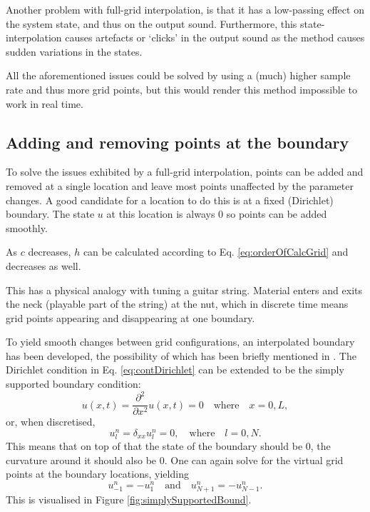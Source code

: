Another problem with full-grid interpolation, is that it has a low-passing effect on the system state, and thus on the output sound. %
Furthermore, this state-interpolation causes artefacts or `clicks' in the output sound as the method causes sudden variations in the states.  

All the aforementioned issues could be solved by using a (much) higher sample rate and thus more grid points, but this would render this method impossible to work in real time.

\subsection{Adding and removing points at the boundary}\label{sec:addAtBoundary}
To solve the issues exhibited by a full-grid interpolation, points can be added and removed at a single location and leave most points unaffected by the parameter changes. A good candidate for a location to do this is at a fixed (Dirichlet) boundary. The state $u$ at this location is always $0$ so points can be added smoothly. 

As $c$ decreases, $h$ can be calculated according to Eq. \eqref{eq:orderOfCalcGrid} and decreases as well.

This has a physical analogy with tuning a guitar string. Material enters and exits the neck (playable part of the string) at the nut, which in discrete time means grid points appearing and disappearing at one boundary.

To yield smooth changes between grid configurations, an interpolated boundary has been developed, the possibility of which has been briefly mentioned in \cite[p. 145]{theBible}. The Dirichlet condition in Eq. \eqref{eq:contDirichlet} can be extended to be the simply supported boundary condition:
\begin{equation}
    u(x, t) = \frac{\partial^2}{\partial x^2}u(x, t) = 0 \quad \text{where} \quad x = 0, L,
\end{equation}
or, when discretised,
\begin{equation}\label{eq:simplySupportedDiscrete}
    u_l^n = \delta_{xx}u_l^n = 0, \quad \text{where} \quad l = 0, N.
\end{equation}
This means that on top of that the state of the boundary should be $0$, the curvature around it should also be $0$. One can again solve for the virtual grid points at the boundary locations, yielding
\begin{equation}
    u_{-1}^n = -u_1^n \quad \text{and} \quad u_{N+1}^n = -u_{N-1}^n.
\end{equation}
This is visualised in Figure \ref{fig:simplySupportedBound}.

